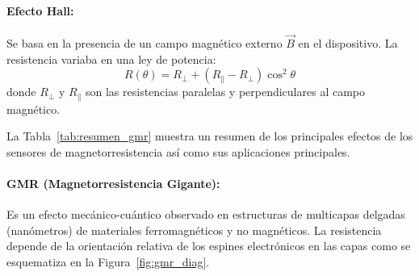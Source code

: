 \paragraph{Efecto Hall:}
Se basa en la presencia de un campo magnético externo $\vec{B}$ en el dispositivo. La resistencia variaba en una ley de potencia:
\begin{equation}    
    R(\theta) = R_{\perp} + (R_{\parallel} - R_{\perp}) \cos^2 \theta
\end{equation}
donde $R_{\perp}$ y $R_{\parallel}$ son las resistencias paralelas y perpendiculares al campo magnético.

La Tabla~\ref{tab:resumen_gmr} muestra un resumen de los principales efectos de los sensores de magnetorresistencia así como sus aplicaciones principales.


\paragraph{GMR (Magnetorresistencia Gigante):}
Es un efecto mecánico-cuántico observado en estructuras de multicapas delgadas (nanómetros) de materiales ferromagnéticos y no magnéticos. La resistencia depende de la orientación relativa de los espines electrónicos en las capas como se esquematiza en la Figura~\ref{fig:gmr_diag}. 

\begin{marginfigure}[10em]
    \centering
    \shorthandoff{>}
    \caption[Estructura simplificada de una celda GMR.]{Estructura simplificada de una celda GMR. El alineamiento de los momentos magnéticos altera la probabilidad de dispersión de los electrones (espintrónica). Libre significa que el alineamiento de los espines electrónicos varia aleatoriamente mientras que fija significa que el alineamiento es fijo. El alineamiento de los momentos magnéticos altera la probabilidad de dispersión de los electrones (espintrónica).}\label{fig:gmr_diag}
\end{marginfigure}

